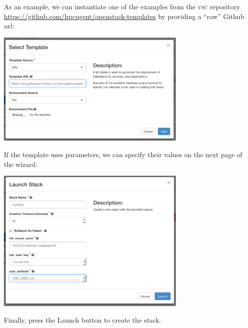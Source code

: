 As an example, we can instantiate one of the examples from the \textsc{vsc}
repository \url{https://github.com/hpcugent/openstack-templates} by
providing a ``raw'' Github url:
\begin{center}
  \includegraphics[width=0.7\textwidth]{img/launch_stack_template}
\end{center}
If the template uses parameters, we can specify their values on the next page of the wizard:
\begin{center}
  \includegraphics[width=0.7\textwidth]{img/launch_stack_parameters}
\end{center}
Finally, press the Launch button to create the stack.

